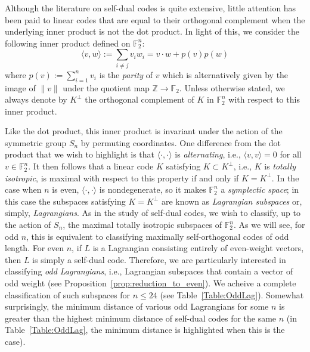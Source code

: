 \documentclass[a4paper,reqno]{amsart}
\newcommand{\bydef}{:=}
\newcommand{\FF}{\mathbb{F}}
\theoremstyle{definition}
\theoremstyle{remark} \newtheorem{remark}[theorem]{Remark}
\numberwithin{equation}{section}
\begin{document}
Although the literature on self-dual codes is quite extensive, little attention has been paid to linear codes that are equal to their orthogonal complement when the underlying inner product is not the dot product. In light of this, we consider the following inner product defined on \(\mathbb{F}_2^n\):
\begin{equation*}
    \langle v, w \rangle \bydef \sum_{i \neq j} v_iw_i = v \cdot w + p(v)p(w)
\end{equation*}
where \(p(v) \bydef \sum_{i = 1}^n v_i\) is the \emph{parity} of \(v\) which is alternatively given by the image of \(\lVert v \rVert\) under the quotient map \(\mathbb{Z} \to \mathbb{F}_2\). Unless otherwise stated, we always denote by \(K^\perp\) the orthogonal complement of \(K\) in \(\mathbb{F}_2^n\) with respect to this inner product. 

Like the dot product, this inner product is invariant under the action of the symmetric group $S_n$ by permuting coordinates. One difference from the dot product that we wish to highlight is that \(\langle \cdot, \cdot \rangle\) is \emph{alternating}, i.e., \(\langle v, v \rangle = 0\) for all \(v \in \mathbb{F}_2^n\). It then follows that a linear code \(K\) satisfying \(K \subset K^\perp\), i.e., \(K\) is \emph{totally isotropic}, is maximal with respect to this property if and only if \(K = K^\perp\). In the case when \(n\) is even, \(\langle \cdot, \cdot \rangle\) is nondegenerate, so it makes $\FF_2^n$ a \emph{symplectic space}; in this case the subspaces satisfying $K = K^\perp$ are known as \emph{Lagrangian subspaces} or, simply, \emph{Lagrangians}. As in the study of self-dual codes, we wish to classify, up to the action of \(S_n\), the maximal totally isotropic subspaces of \(\mathbb{F}_2^n\). As we will see, for odd $n$, this is equivalent to classifying maximally self-orthogonal codes of odd length. For even $n$, if \(L\) is a Lagrangian consisting entirely of even-weight vectors, then \(L\) is simply a self-dual code. Therefore, we are particularly interested in classifying \emph{odd Lagrangians}, i.e., Lagrangian subspaces that contain a vector of odd weight (see Proposition~\ref{prop:reduction_to_even}). We acheive a complete classification of such subspaces for \(n \leq 24\) (see Table~\ref{Table:OddLag}). Somewhat surprisingly, the minimum distance of various odd Lagrangians for some $n$ is greater than the highest minimum distance of self-dual codes for the same $n$ (in Table~\ref{Table:OddLag}, the minimum distance is highlighted when this is the case). 
\end{document}
